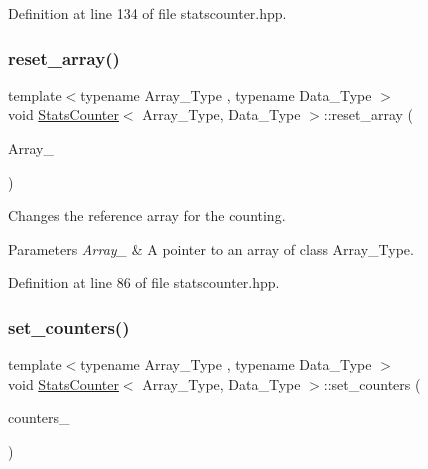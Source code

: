 Definition at line 134 of file statscounter.\+hpp.

\mbox{\label{class_stats_counter_a8dabc3a7a9931acbb76900a67d728f70}} 
\subsubsection{\texorpdfstring{reset\+\_\+array()}{reset\_array()}}
{\footnotesize\ttfamily template$<$typename Array\+\_\+\+Type , typename Data\+\_\+\+Type $>$ \\
void \hyperlink{class_stats_counter}{Stats\+Counter}$<$ Array\+\_\+\+Type, Data\+\_\+\+Type $>$\+::reset\+\_\+array (\begin{DoxyParamCaption}\item[{const Array\+\_\+\+Type $\ast$}]{Array\+\_\+ }\end{DoxyParamCaption})\hspace{0.3cm}{\ttfamily [inline]}}



Changes the reference array for the counting. 


\begin{DoxyParams}{Parameters}
{\em Array\+\_\+} & A pointer to an array of class {\ttfamily Array\+\_\+\+Type}. \\
\hline
\end{DoxyParams}


Definition at line 86 of file statscounter.\+hpp.

\mbox{\label{class_stats_counter_a6aae81ab39ef452aedd7743fa8221855}} 
\subsubsection{\texorpdfstring{set\+\_\+counters()}{set\_counters()}}
{\footnotesize\ttfamily template$<$typename Array\+\_\+\+Type , typename Data\+\_\+\+Type $>$ \\
void \hyperlink{class_stats_counter}{Stats\+Counter}$<$ Array\+\_\+\+Type, Data\+\_\+\+Type $>$\+::set\+\_\+counters (\begin{DoxyParamCaption}\item[{\hyperlink{class_counter_vector}{Counter\+Vector}$<$ Array\+\_\+\+Type, Data\+\_\+\+Type $>$ $\ast$}]{counters\+\_\+ }\end{DoxyParamCaption})\hspace{0.3cm}{\ttfamily [inline]}}



